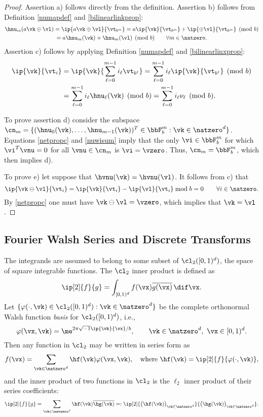 \documentclass[]{elsarticle}
\theoremstyle{definition}
\newcommand{\cube}{[0,1)^d}
\renewcommand{\bbK}{\natzero^d}
\begin{document}
\begin{proof} Assertion a) follows directly from the definition.  Assertion b) follows from Definition \ref{numapdef} and \eqref{bilinearlinkprop}: 
\begin{multline*}
\hnu_m(a\vk \oplus \vl)= \ip{a\vk \oplus \vl}{\vt_{b^m}} = a\ip{\vk}{\vt_{b^m}} + \ip{\oplus \vl}{\vt_{b^m}} \pmod b \\
= a\hnu_m(\vk) + \hnu_m(\vl) \pmod b \qquad \forall m \in \natzero.
\end{multline*}
Assertion c) follows by applying  Definition \ref{numapdef} and \eqref{bilinearlinxprop}:
\begin{align*}
\ip{\vk}{\vt_i} &= \ip{\vk}{\sum_{\ell=0}^{m-1} i_\ell \vt_{b^{\ell}}} = \sum_{\ell=0}^{m-1} i_\ell \ip{\vk}{\vt_{b^{\ell}}} \pmod b \\
& = \sum_{\ell=0}^{m-1} i_\ell \hnu_\ell(\vk) \pmod b = \sum_{\ell=0}^{m-1} i_\ell \nu_\ell \pmod b.
\end{align*}

To prove assertion d) consider the subspace  
$\cn_m = \{(\hnu_0(\vk), \ldots,  \hnu_{m-1}(\vk))^T \in \bbF_b^m : \vk \in \bbK\}$.
Equations \eqref{netpropc} and \eqref{nuwisum} imply that the only $\vi \in \bbF_b^m$ for which $\vi^T\vnu=0$ for all $\vnu \in \cn_m$ is $\vi=\vzero$.  Thus, $\cn_m=\bbF_b^m$, which then implies d).  

To prove e) let suppose that $\hvnu(\vk)=\hvnu(\vl)$.  It follows from c) that 
\[
\ip{\vk\ominus\vl}{\vt_i} = \ip{\vk}{\vt_i} - \ip{\vl}{\vt_i} \bmod b = 0 \qquad \forall i\in \natzero.
\]
By \eqref{netpropc} one must have $\vk\ominus\vl=\vzero$, which implies that $\vk=\vl$. 
\end{proof}

\subsection{Fourier Walsh Series and Discrete Transforms}

The integrands are assumed to belong to some subset of $\cl_2(\cube)$, the space of square integrable functions.  The $\cl_2$ inner product is defined as 
\[
\ip[2]{f}{g} = \int_{\cube} f(\vx) \overline{g(\vx)} \, \dif \vx.
\]
Let $\{\varphi(\cdot,\vk) \in \cl_2(\cube) : \vk \in \bbK\}$ be the complete orthonormal Walsh function \emph{basis} for $\cl_2(\cube)$, i.e., 
\[
\varphi(\vx,\vk)  = \me^{2 \pi \sqrt{-1} \ip{\vk}{\vx}/b}, \qquad \vk \in \bbK, \ \vx \in \cube.
\]
Then any function in $\cl_2$ may be written in series form as
\begin{equation} \label{Fourierdef}
f(\vx) = \sum_{\vk \in \bbK} \hf(\vk) \varphi(\vx,\vk), \quad \text{where } \hf(\vk) = \ip[2]{f}{\varphi(\cdot,\vk)},
\end{equation}
and the inner product of two functions in $\cl_2$ is the $\ell_2$ inner product of their series coefficients:
\[
\ip[2]{f}{g} = \sum_{\vk \in \bbK} \hf(\vk)\overline{\hg(\vk)} =: \ip[2]{\bigl(\hf(\vk)\bigr)_{\vk \in \bbK}}{\bigl ( \hg(\vk)\bigr )_{\vk \in \bbK}}.
\]
\end{document}
